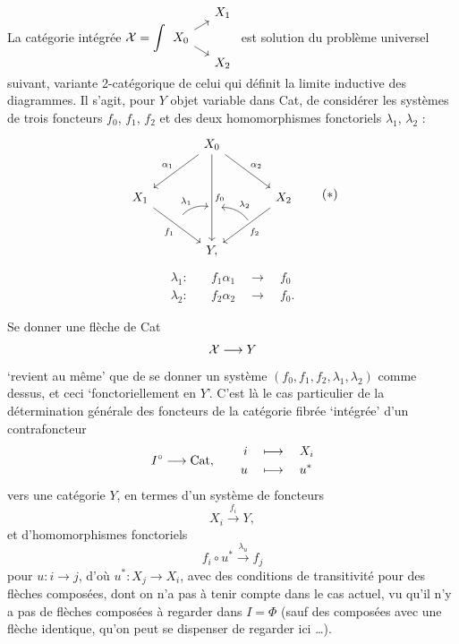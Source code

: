 La catégorie intégrée $\cX = \displaystyle\int
\begin{tikzcd}[column sep=small, row sep=tiny, ampersand replacement=\&, baseline=(\tikzcdmatrixname-2-1.base)]
 \& X_1 \\
X_0 \arrow[ur] \arrow[dr] \& \\
 \& X_2
\end{tikzcd}$ est solution du problème universel suivant, variante 2-catégorique de celui qui définit la limite inductive des diagrammes. Il s'agit, pour $Y$ objet variable dans Cat, de considérer les systèmes de trois foncteurs $f_0$, $f_1$, $f_2$ et des deux homomorphismes fonctoriels $\lambda_1$, $\lambda_2$ :
\[
\begin{tikzcd}[column sep=large, row sep=large, ampersand replacement=\&]
 \& X_0 \arrow[dl, "\alpha_1"'] \arrow[dr, "\alpha_2"] \arrow[dd, "f_0", ""{name=M, pos=0.62}] \& \\
X_1 \arrow[dr, "f_1"', ""{name=A, pos=0.45}] \& \& X_2 \arrow[dl, "f_2", ""{name=B, pos=0.45}] \\
 \& Y, \&
\arrow[from=A, to=M, bend left, shorten=3pt, "\lambda_1"]
\arrow[from=B, to=M, bend right, shorten=3pt, "\lambda_2"']
\end{tikzcd}
\tag*{$(*)$}
\]
\[
\begin{aligned}
\lambda_1 :\quad & f_1\alpha_1 \quad\longrightarrow\quad f_0\\
\lambda_2 :\quad & f_2\alpha_2 \quad\longrightarrow\quad f_0.
\end{aligned}
\]

Se donner une flèche de Cat
\[
\mathcal{X} \longrightarrow Y
\]
`revient au même' que de se donner un système $(f_0, f_1, f_2, \lambda_1, \lambda_2)$ comme dessus, et ceci `fonctoriellement en $Y$'. C'est là le cas particulier de la détermination générale des foncteurs de la catégorie fibrée `intégrée' d'un contrafoncteur
\[
I^{\circ} \longrightarrow \mathrm{Cat}, \qquad
\begin{aligned}
i &\quad\longmapsto\quad X_i\\
u &\quad\longmapsto\quad u^*
\end{aligned}
\]
vers une catégorie $Y$, en termes d'un système de foncteurs
\[
X_i \xrightarrow{f_i} Y,
\]
et d'homomorphismes fonctoriels
\[
f_i\circ u^* \xrightarrow{\lambda_u} f_j
\]
pour $u : i \longrightarrow j$, d'où $u^* : X_j \longrightarrow X_i$, avec des conditions de transitivité pour des flèches composées, dont on n'a pas à tenir compte dans le cas actuel, vu qu'il n'y a pas de flèches composées à regarder dans $I = \Phi$ (sauf des composées avec une flèche identique, qu'on peut se dispenser de regarder ici \dots).

